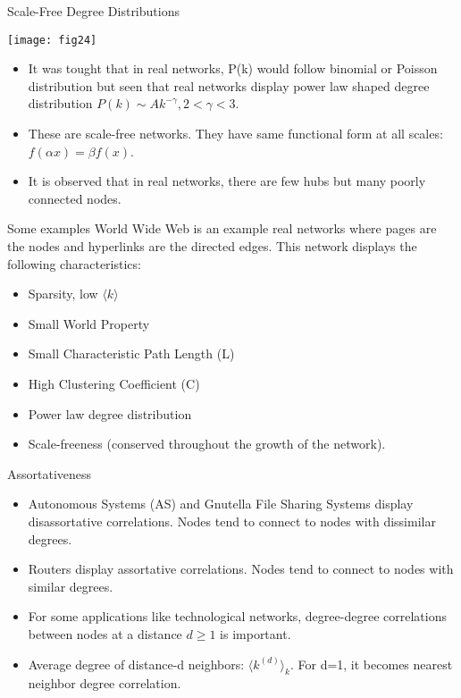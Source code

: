 \documentclass{beamer}
\begin{document}
\begin{frame}{Scale-Free Degree Distributions}
\begin{center}

\texttt{[image: fig24]}
\end{center}

\begin{itemize}
 \item It was tought that in real networks, P(k) would follow binomial or Poisson distribution but seen that real networks display power law shaped degree distribution $P(k) \sim Ak^{-\gamma}, 2 < \gamma < 3$.
 \item These are scale-free networks. They have same functional form at all scales: $f(\alpha x) = \beta f(x)$.
 \item It is observed that in real networks, there are few hubs but many poorly connected nodes.
\end{itemize}

\end{frame}


\begin{frame}{Some examples}
World Wide Web is an example real networks where pages are the nodes and hyperlinks are the directed edges. This network displays the following characteristics:
\begin{itemize}
 \item Sparsity, low $\langle k \rangle$
 \item Small World Property
 \item Small Characteristic Path Length (L)
 \item High Clustering Coefficient (C)
 \item Power law degree distribution
 \item Scale-freeness (conserved throughout the growth of the network).
\end{itemize}


\end{frame}


\begin{frame}{Assortativeness}

\begin{itemize}
 \item Autonomous Systems (AS) and Gnutella File Sharing Systems display disassortative correlations. Nodes tend to connect to nodes with dissimilar degrees.
 \item Routers display assortative correlations. Nodes tend to connect to nodes with similar degrees.
 \item For some applications like technological networks, degree-degree correlations between nodes at a distance $d \geq 1$ is important.
 \item Average degree of distance-d neighbors: $\langle k^{(d)} \rangle_k$. For d=1, it becomes nearest neighbor degree correlation.
\end{itemize}

\end{frame}
\end{document}
